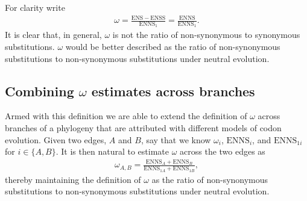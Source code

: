 \documentclass[a4paper,oneside,12pt]{article}
\begin{document}
For clarity write
\begin{align*}
\omega = \frac{\mathrm{ENS}-\mathrm{ENSS}}{\mathrm{ENNS}_1} = \frac{\mathrm{ENNS}}{\mathrm{ENNS}_1}.
\end{align*}
It is clear that, in general, $\omega$ is not the ratio of non-synonymous to synonymous substitutions. $\omega$ would be better described as the ratio of non-synonymous substitutions to non-synonymous substitutions under neutral evolution.

\subsection*{Combining $\omega$ estimates across branches}
Armed with this definition we are able to extend the definition of $\omega$ across branches of a phylogeny that are attributed with different models of codon evolution. Given two edges, $A$ and $B$, say that we know $\omega_i$, $\mathrm{ENNS}_i$, and $\mathrm{ENNS}_{1i}$ for $i\in\{A,B\}$. It is then natural to estimate $\omega$ across the two edges as
\begin{align*}
\omega_{A,B} = \frac{\mathrm{ENNS}_A+\mathrm{ENNS}_B}{\mathrm{ENNS}_{1A}+\mathrm{ENNS}_{1B}},
\end{align*}
thereby maintaining the definition of $\omega$ as the ratio of non-synonymous substitutions to non-synonymous substitutions under neutral evolution.
\end{document}
